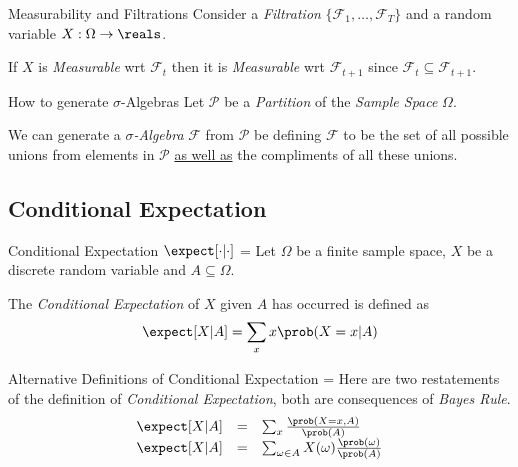 \documentclass[11pt,a4paper]{article}
\begin{document}
  \begin{proposition}{Measurability and Filtrations}
    Consider a \textit{Filtration} $\{\mathcal{F}_1,\dots,\mathcal{F}_T\}$ and a random variable $X:\Omega\to\reals$.
    \par If $X$ is \textit{Measurable} wrt $\mathcal{F}_t$ then it is \textit{Measurable} wrt $\mathcal{F}_{t+1}$ since $\mathcal{F}_t\subseteq\mathcal{F}_{t+1}$.
  \end{proposition}

  \begin{proposition}{How to generate $\sigma$-Algebras}\label{prop_generate_sigma_algebras}
    Let $\mathcal{P}$ be a \textit{Partition} of the \textit{Sample Space} $\Omega$.
    \par We can generate a \textit{$\sigma$-Algebra} $\mathcal{F}$ from $\mathcal{P}$ be defining $\mathcal{F}$ to be the set of all possible unions from elements in $\mathcal{P}$ \underline{as well as} the compliments of all these unions.
  \end{proposition}

\subsection{Conditional Expectation}

  \begin{definition}{Conditional Expectation $\expect[\cdot|\cdot]$}
    \everymath={\displaystyle}
    Let $\Omega$ be a finite sample space, $X$ be a discrete random variable and $A\subseteq\Omega$.
    \par The \textit{Conditional Expectation} of $X$ given $A$ has occurred is defined as
    \[ \expect[X|A]=\sum_xx\prob(X=x|A) \]
  \end{definition}

  \begin{remark}{Alternative Definitions of Conditional Expectation}
    \everymath={\displaystyle}
    Here are two restatements of the definition of \textit{Conditional Expectation}, both are consequences of \textit{Bayes Rule}.
    \[\begin{array}{rcl}
      \expect[X|A]&=&\sum_x\frac{\prob(X=x,A)}{\prob(A)}\\
      \expect[X|A]&=&\sum_{\omega\in A}X(\omega)\frac{\prob(\omega)}{\prob(A)}
    \end{array}\]
  \end{remark}
\end{document}
